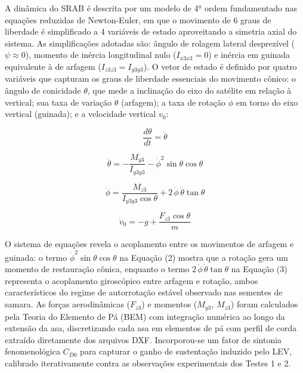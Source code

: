 \documentclass[12pt,fleqn]{article}
\begin{document}
A dinâmica do SRAB é descrita por um modelo de 4$^{\underline{a}}$ ordem fundamentado nas equações reduzidas de Newton-Euler, em que o movimento de 6 graus de liberdade é simplificado a 4 variáveis de estado aproveitando a simetria axial do sistema. As simplificações adotadas são: ângulo de rolagem lateral desprezível ($\psi \approx 0$), momento de inércia longitudinal nulo ($I_{x3x3}=0$) e inércia em guinada equivalente à de arfagem ($I_{z3z3}=I_{y3y3}$). O vetor de estado é definido por quatro variáveis que capturam os graus de liberdade essenciais do movimento cônico: o ângulo de conicidade $\theta$, que mede a inclinação do eixo do satélite em relação à vertical; sua taxa de variação $\dot\theta$ (arfagem); a taxa de rotação $\dot\phi$ em torno do eixo vertical (guinada); e a velocidade vertical $v_0$:

\begin{equation}
\frac{d\theta}{dt} = \dot\theta
\end{equation}

\begin{equation}
\ddot\theta = -\frac{M_{y3}}{I_{y3y3}} - \dot\phi^2 \sin\theta \cos\theta
\end{equation}

\begin{equation}
\ddot\phi = \frac{M_{z3}}{I_{y3y3} \cos\theta} + 2\,\dot\phi\,\dot\theta \tan\theta
\end{equation}

\begin{equation}
\dot v_0 = -g + \frac{F_{z3} \cos\theta}{m}
\end{equation}

O sistema de equações revela o acoplamento entre os movimentos de arfagem e guinada: o termo $\dot\phi^2 \sin\theta \cos\theta$ na Equação (2) mostra que a rotação gera um momento de restauração cônica, enquanto o termo $2\,\dot\phi\,\dot\theta \tan\theta$ na Equação (3) representa o acoplamento giroscópico entre arfagem e rotação, ambos característicos do regime de autorrotação estável observado nas sementes de samara. As forças aerodinâmicas ($F_{z3}$) e momentos ($M_{y3}$, $M_{z3}$) foram calculados pela Teoria do Elemento de Pá (BEM) com integração numérica ao longo da extensão da asa, discretizando cada asa em elementos de pá com perfil de corda extraído diretamente dos arquivos DXF. Incorporou-se um fator de sintonia fenomenológica $C_{D0}$ para capturar o ganho de sustentação induzido pelo LEV, calibrado iterativamente contra as observações experimentais dos Testes 1 e 2.
\end{document}
